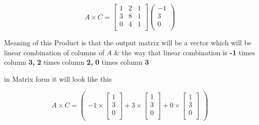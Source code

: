 \documentclass[a4paper,11pt]{article}
\numberwithin{equation}{section}
\begin{document}
\begin{itemize}
\begin{itemize}
                \begin{equation}
                    A \times C=
                    \begin{bmatrix}
                        1 & 2 & 1 \\
                        3 & 8 & 1 \\
                        0 & 4 & 1 \\
                    \end{bmatrix}
                    \begin{pmatrix}
                        -1\\
                    3\\
                    0\\
                    \end{pmatrix}
                \end{equation}
                    
                Meaning of this Product is that the output matrix will be a vector which will be linear combination of columns of $A$ \& the way that linear combination is  \textbf{-1} times column \textbf{3,} \textbf{2} times column \textbf{2,} \textbf{0} times column \textbf{3} 

                in Matrix form it will look like this

                \begin{equation}
                    A \times C=
                    \begin{pmatrix}
                        -1 \times 
                        \begin{bmatrix}
                            1 \\
                            3  \\
                            0  \\
                        \end{bmatrix}+
                        3 \times 
                        \begin{bmatrix}
                            1 \\
                            3  \\
                            0  \\
                        \end{bmatrix}+
                        0 \times 
                        \begin{bmatrix}
                            1 \\
                            3  \\
                            0  \\
                        \end{bmatrix}
                    \end{pmatrix}
                \end{equation}




\end{itemize}
\end{itemize}
\end{document}
